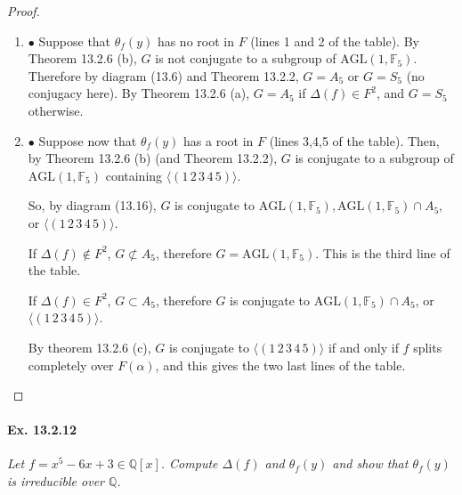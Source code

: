 \documentclass[11pt,a4paper]{article}
\newcommand{\be} {\begin{enumerate}}
\newcommand{\ee} {\end{enumerate}}
\newcommand{\Q}{\mathbb{Q}}
\newcommand{\F}{\mathbb{F}}
\begin{document}
\begin{proof}
\be
\item[$\bullet$]  Suppose that $\theta_f(y)$ has no root in $F$ (lines 1 and 2 of the table). By Theorem 13.2.6 (b), $G$ is not conjugate to a subgroup of $\mathrm{AGL}(1,\F_5)$. Therefore by diagram (13.6) and Theorem 13.2.2, $G = A_5$ or $G = S_5$ (no conjugacy here). By Theorem 13.2.6 (a), $G = A_5$ if $\Delta(f) \in F^2$, and $G = S_5$ otherwise.

\item[$\bullet$]   Suppose now that $\theta_f(y)$ has a root in $F$ (lines 3,4,5 of the table). Then, by Theorem 13.2.6 (b) (and Theorem 13.2.2), $G$ is conjugate to a subgroup of $\mathrm{AGL}(1,\F_5)$ containing $\langle (1\,2\,3\,4\,5) \rangle$. 

So, by diagram (13.16), $G$ is conjugate to $\mathrm{AGL}(1,\F_5), \mathrm{AGL}(1,\F_5) \cap A_5$, or $\langle (1\,2\,3\,4\,5) \rangle$.

If $\Delta(f) \not \in F^2$, $G \not \subset A_5$, therefore $G = \mathrm{AGL}(1,\F_5)$. This is the third line of the table.

If $\Delta(f)  \in F^2$, $G \subset A_5$, therefore $G$ is conjugate to $\mathrm{AGL}(1,\F_5) \cap A_5$, or $\langle (1\,2\,3\,4\,5) \rangle$.

By theorem 13.2.6 (c), $G$ is conjugate to $\langle (1\,2\,3\,4\,5) \rangle$ if and only if $f$ splits completely over $F(\alpha)$, and this gives the two last lines of the table.
\ee
\end{proof}

\paragraph{Ex. 13.2.12}

{\it Let $f = x^5 - 6x+3 \in \Q[x]$. Compute $\Delta(f)$ and $\theta_f(y)$ and show that $\theta_f(y)$ is irreducible over $\Q$.
}
\end{document}
